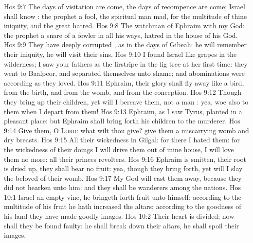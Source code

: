 \vs Hos 9:7 The days of visitation are come, the days of recompence are come; Israel shall know : the prophet  a fool, the spiritual man  mad, for the multitude of thine iniquity, and the great hatred.
\vs Hos 9:8 The watchman of Ephraim  with my God:  the prophet  a snare of a fowler in all his ways,  hatred in the house of his God.
\vs Hos 9:9 They have deeply corrupted , as in the days of Gibeah:  he will remember their iniquity, he will visit their sins.
\vs Hos 9:10 I found Israel like grapes in the wilderness; I saw your fathers as the firstripe in the fig tree at her first time:  they went to Baalpeor, and separated themselves unto  shame; and  abominations were according as they loved.
\vs Hos 9:11  Ephraim, their glory shall fly away like a bird, from the birth, and from the womb, and from the conception.
\vs Hos 9:12 Though they bring up their children, yet will I bereave them,  not  a man : yea, woe also to them when I depart from them!
\vs Hos 9:13 Ephraim, as I saw Tyrus,  planted in a pleasant place: but Ephraim shall bring forth his children to the murderer.
\vs Hos 9:14 Give them, O \textsc{Lord}: what wilt thou give? give them a miscarrying womb and dry breasts.
\vs Hos 9:15 All their wickedness  in Gilgal: for there I hated them: for the wickedness of their doings I will drive them out of mine house, I will love them no more: all their princes  revolters.
\vs Hos 9:16 Ephraim is smitten, their root is dried up, they shall bear no fruit: yea, though they bring forth, yet will I slay  the beloved  of their womb.
\vs Hos 9:17 My God will cast them away, because they did not hearken unto him: and they shall be wanderers among the nations.
\vs Hos 10:1 Israel  an empty vine, he bringeth forth fruit unto himself: according to the multitude of his fruit he hath increased the altars; according to the goodness of his land they have made goodly images.
\vs Hos 10:2 Their heart is divided; now shall they be found faulty: he shall break down their altars, he shall spoil their images.
